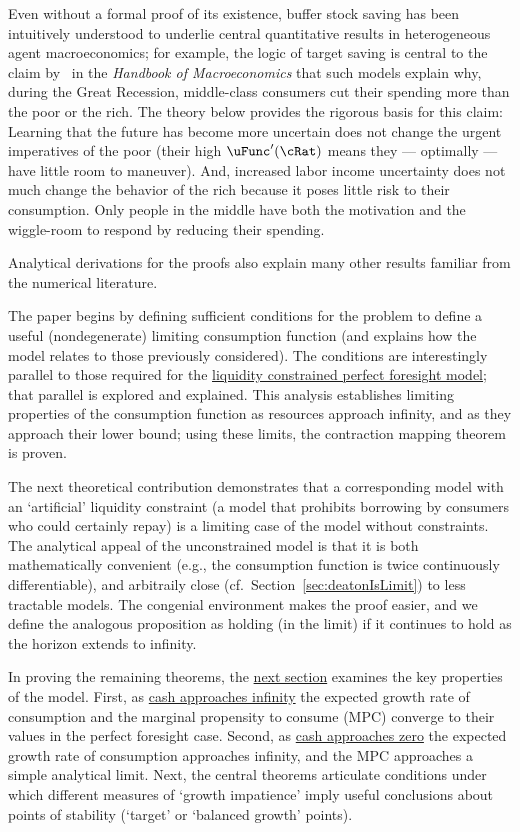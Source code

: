 \documentclass[BufferStockTheory]{subfiles}
\begin{document}
\hypertarget{KMP}{} Even without a formal proof of its existence, buffer stock saving has been intuitively understood to underlie central quantitative results in heterogeneous agent macroeconomics; for example, the logic of target saving is central to the claim by~\cite{kmpHandbook} in the \textit{Handbook of Macroeconomics} that such models explain why, during the Great Recession, middle-class consumers cut their spending more than the poor or the rich.  The theory below provides the rigorous basis for this claim:  Learning that the future has become more uncertain does not change the urgent imperatives of the poor (their high $\uFunc^{\prime}(\cRat)$ means they --- optimally --- have little room to maneuver).  And, increased labor income uncertainty does not much change the behavior of the rich because it poses little risk to their consumption.  Only people in the middle have both the motivation and the wiggle-room to respond by reducing their spending.

Analytical derivations for the proofs also explain many other results familiar from the numerical literature.

The paper begins by defining sufficient conditions for the problem to define a useful (nondegenerate) limiting consumption function (and explains how the model relates to those previously considered).  The conditions are interestingly parallel to those required for the \hyperlink{Factors-Defined-And-Compared}{liquidity constrained perfect foresight model}; that parallel is explored and explained.  This analysis establishes limiting properties of the consumption function as resources approach infinity, and as they approach their lower bound; using these limits, the contraction mapping theorem is proven.

The next theoretical contribution demonstrates that a corresponding model with an `artificial' liquidity constraint (a model that prohibits borrowing by consumers who could certainly repay) is a limiting case of the model without constraints. The analytical appeal of the unconstrained model is that it is both mathematically convenient (e.g., the consumption function is twice continuously differentiable), and arbitraily close (cf.\ Section~\ref{sec:deatonIsLimit}) to less tractable models. The congenial environment makes the proof easier, and we define the analogous proposition as holding (in the limit) if it continues to hold as the horizon extends to infinity.

In proving the remaining theorems, the \hyperlink{AnalysisoftheConvergedConsumptionFunction}{next section} examines the key properties of the model. First, as \hyperlink{LimitsAsmtToInfty}{cash approaches infinity} the expected growth rate of consumption and the marginal propensity to consume (MPC) converge to their values in the perfect foresight case. Second, as \hyperlink{LimitsAsmtToZero}{cash approaches zero} the expected growth rate of consumption approaches infinity, and the MPC approaches a simple analytical limit.  Next, the central theorems articulate conditions under which different measures of `growth impatience' imply useful conclusions about points of stability (`target' or `balanced growth' points).
\end{document}
